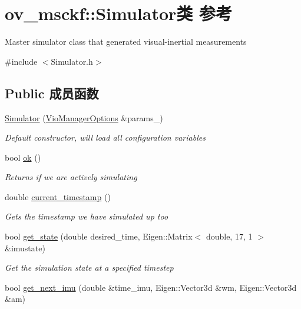 \hypertarget{classov__msckf_1_1Simulator}{}\section{ov\+\_\+msckf\+:\+:Simulator类 参考}
\label{classov__msckf_1_1Simulator}


Master simulator class that generated visual-\/inertial measurements  




{\ttfamily \#include $<$Simulator.\+h$>$}

\subsection*{Public 成员函数}
\begin{DoxyCompactItemize}
\item 
\hyperlink{classov__msckf_1_1Simulator_ab36fe774609d9e764219266867e21c4d}{Simulator} (\hyperlink{structov__msckf_1_1VioManagerOptions}{Vio\+Manager\+Options} \&params\+\_\+)
\begin{DoxyCompactList}\small\item\em Default constructor, will load all configuration variables \end{DoxyCompactList}\item 
bool \hyperlink{classov__msckf_1_1Simulator_a23596249c56e31c4a74567b4f4601a7c}{ok} ()
\begin{DoxyCompactList}\small\item\em Returns if we are actively simulating \end{DoxyCompactList}\item 
double \hyperlink{classov__msckf_1_1Simulator_a10fbc2c949b380e152a3b9097b5b6643}{current\+\_\+timestamp} ()
\begin{DoxyCompactList}\small\item\em Gets the timestamp we have simulated up too \end{DoxyCompactList}\item 
bool \hyperlink{classov__msckf_1_1Simulator_a3ccf4a1249f70725edad1f9f4e80f9e9}{get\+\_\+state} (double desired\+\_\+time, Eigen\+::\+Matrix$<$ double, 17, 1 $>$ \&imustate)
\begin{DoxyCompactList}\small\item\em Get the simulation state at a specified timestep \end{DoxyCompactList}\item 
bool \hyperlink{classov__msckf_1_1Simulator_a1a5c6dd7e892a8948d3c2d2a3824fb39}{get\+\_\+next\+\_\+imu} (double \&time\+\_\+imu, Eigen\+::\+Vector3d \&wm, Eigen\+::\+Vector3d \&am)

\end{DoxyCompactItemize}
